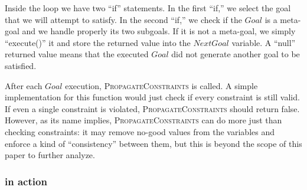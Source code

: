 \documentclass{ws-ijait}
\begin{document}
Inside the loop we have two ``if'' statements. In the first
``if,'' we select the goal that we will attempt to satisfy.
In the second ``if,'' we check if the $\mathit{Goal}$ is a
meta-goal and we handle properly its two subgoals. If it is
not a meta-goal, we simply ``execute()'' it and store the
returned value into the $\mathit{NextGoal}$ variable. A
``null'' returned value means that the executed
$\mathit{Goal}$ did not generate another goal to be
satisfied.

After each $\mathit{Goal}$ execution,
\textsc{PropagateConstraints} is called. A simple
implementation for this function would just check if every
constraint is still valid. If even a single constraint is
violated, \textsc{PropagateConstraints} should return false.
However, as its name implies, \textsc{PropagateConstraints}
can do more just than checking constraints: it may remove
no-good values from the variables and enforce a kind of
``consistency'' between them, but this is beyond the scope
of this paper to further analyze.\cite{AC}

\subsubsection{\SolveNormal{} in action}
\end{document}
